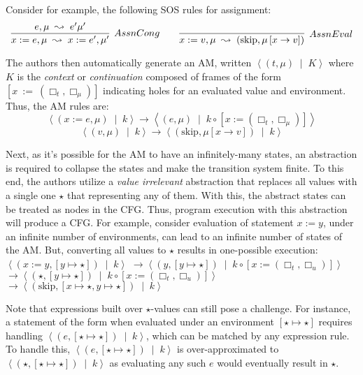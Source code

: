 Consider for example, the following SOS rules for assignment:
$$
\infer[AssnCong]
{x := e, \mu\; \leadsto\; x := e^{\prime}, \mu^{\prime}}{e, \mu\; \leadsto\; e^{\prime}\mu^{\prime}}
\quad \quad
\infer[AssnEval]
{x := v,\mu\; \leadsto\; \left(\text{skip}, \mu\left[x \rightarrow v\right]\right)}{}
$$

The authors then automatically generate an AM, written
$\left\langle \left(t, \mu\right) \;\mid\; K\right\rangle$ where $K$ is the
\emph{context} or \emph{continuation} composed of frames of the form $[x\ :=\
(\Box_{t}, \Box_{\mu})]$ indicating holes for an evaluated value and
environment. Thus, the AM rules are:
$$
\left\langle \left( x := e, \mu \right)\;\mid\; k \right\rangle \rightarrow
\left\langle \left( e, \mu \right)\;\mid\; k \circ \left[x := \left(\Box_t,\Box_{\mu}\right) \right]\right\rangle
$$
$$
\left\langle \left( v, \mu \right)\;\mid\; k \right\rangle \rightarrow
\left\langle \left(\text{skip}, \mu\left[x \rightarrow v \right] \right) \;\mid\; k \right\rangle
$$

Next, as it's possible for the AM to have an infinitely-many states, an
abstraction is required to collapse the states and make the transition system
finite. To this end, the authors utilize a \emph{value irrelevant} abstraction
that replaces all values with a single one $\star$ that representing any of
them. With this, the abstract states can be treated as nodes in the CFG.
Thus, program execution with this abstraction will produce a CFG.
For example, consider evaluation of statement $x := y$, under an
infinite number of environments, can lead to an infinite number of
states of the AM.
But, converting all values to $\star$ results in
one-possible execution: $\left\langle \left( x := y, \left[ y \mapsto \star
    \right] \right) \;\mid\; k \right\rangle$
$\rightarrow  \left\langle \left(y, \left[ y \mapsto \star \right] \right) \;\mid\; k \circ \left[ x := \left(\Box_t,\Box_u\right) \right] \right\rangle$
$\rightarrow  \left\langle \left(\star, \left[ y \mapsto \star \right] \right) \;\mid\; k \circ \left[ x := \left(\Box_t,\Box_u\right) \right] \right\rangle$
$\rightarrow  \left\langle \left(\text{skip}, \left[x \mapsto \star, y \mapsto \star \right] \right) \;\mid\; k \right\rangle$

Note that expressions built over $\star$-values can still pose a
challenge. For instance, a statement of the form  when
evaluated under an environment $\left[\star \mapsto \star\right]$ requires
handling $\left\langle \left(e, \left[ \star \mapsto \star \right] \right)\;\mid\; k
\right\rangle$, which can be matched by any expression rule. To handle this,
$\left\langle \left(e, \left[ \star \mapsto \star \right] \right)\;\mid\; k \right\rangle$
is over-approximated to $\left \langle \left(\star, \left[ \star \mapsto \star \right] \right)\;\mid\; k \right\rangle$
as evaluating any such $e$ would eventually result in $\star$.


